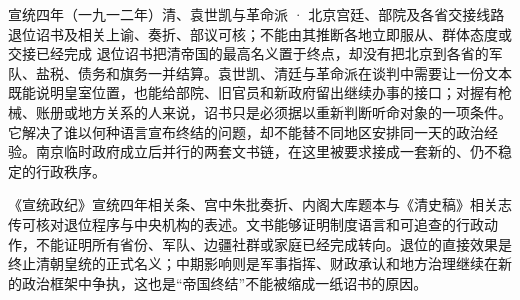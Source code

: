 \begin{event}{}{宣统四年（一九一二年）}{清、袁世凯与革命派 · 北京宫廷、部院及各省交接线路}{退位诏书及相关上谕、奏折、部议可核；不能由其推断各地立即服从、群体态度或交接已经完成}
退位诏书把清帝国的最高名义置于终点，却没有把北京到各省的军队、盐税、债务和旗务一并结算。袁世凯、清廷与革命派在谈判中需要让一份文本既能说明皇室位置，也能给部院、旧官员和新政府留出继续办事的接口；对握有枪械、账册或地方关系的人来说，诏书只是必须据以重新判断听命对象的一项条件。它解决了谁以何种语言宣布终结的问题，却不能替不同地区安排同一天的政治经验。南京临时政府成立后并行的两套文书链，在这里被要求接成一套新的、仍不稳定的行政秩序。

《宣统政纪》宣统四年相关条、宫中朱批奏折、内阁大库题本与《清史稿》相关志传可核对退位程序与中央机构的表述。文书能够证明制度语言和可追查的行政动作，不能证明所有省份、军队、边疆社群或家庭已经完成转向。退位的直接效果是终止清朝皇统的正式名义；中期影响则是军事指挥、财政承认和地方治理继续在新的政治框架中争执，这也是“帝国终结”不能被缩成一纸诏书的原因。
\end{event}
